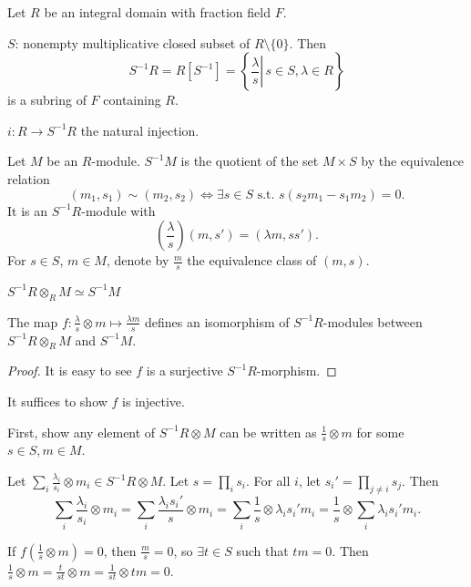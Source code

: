 \documentclass[11pt, a4paper]{report}
\begin{document}
\begin{definition}[$S^{-1} R$]
Let $R$ be an integral domain with fraction field $F$.

$S$: nonempty multiplicative closed subset of $R \setminus \{0\}$. Then
\[
S^{-1} R=R\left[S^{-1}\right]=\left\{\left.\frac{\lambda}{s} \right\rvert\, s \in S, \lambda \in R\right\}
\]
is a subring of $F$ containing $R$.

$i: R \rightarrow S^{-1} R$ the natural injection.
\end{definition}

\begin{definition}[$S^{-1} M$]
Let $M$ be an $R$-module. $S^{-1} M$ is the quotient of the set $M \times S$ by the equivalence relation
\[
(m_{1}, s_{1}) \sim (m_{2}, s_{2}) \Leftrightarrow \exists s \in S \text{ s.t.\ } s(s_{2} m_{1}-s_{1} m_{2})=0.
\]
It is an $S^{-1} R$-module with
\[
\left(\frac{\lambda}{s}\right)\left(m, s'\right)=\left(\lambda m, s s'\right).
\]
For $s \in S$, $m \in M$, denote by $\frac{m}{s}$ the equivalence class of $(m, s)$.
\end{definition}

\begin{lemma}
$S^{-1} R \otimes_{R} M \simeq S^{-1} M$

The map $f\colon \frac{\lambda}{s} \otimes m \mapsto \frac{\lambda m}{s}$ defines an isomorphism of $S^{-1} R$-modules between $S^{-1} R \otimes_{R} M$ and $S^{-1} M$.
\end{lemma}

\begin{proof}
It is easy to see $f$ is a surjective $S^{-1} R$-morphism.
\end{proof}
It suffices to show $f$ is injective.

First, show any element of $S^{-1} R \otimes M$ can be written as $\frac{1}{s} \otimes m$ for some $s \in S, m \in M$.

Let $\sum_{i} \frac{\lambda_{i}}{s_{i}} \otimes m_{i} \in S^{-1} R \otimes M$. Let $s = \prod_{i} s_{i}$. For all $i$, let $s_{i}' = \prod_{j \neq i} s_{j}$. Then
\[
\sum_{i} \frac{\lambda_{i}}{s_{i}} \otimes m_{i} = \sum_{i} \frac{\lambda_{i} s_{i}'}{s} \otimes m_{i} = \sum_{i} \frac{1}{s} \otimes \lambda_{i} s_{i}' m_{i} = \frac{1}{s} \otimes \sum_{i} \lambda_{i} s_{i}' m_{i}.
\]

If $f\left(\frac{1}{s} \otimes m\right) = 0$, then $\frac{m}{s} = 0$, so $\exists t \in S$ such that $tm = 0$. Then $\frac{1}{s} \otimes m = \frac{t}{st} \otimes m = \frac{1}{st} \otimes tm = 0$.
\end{document}
